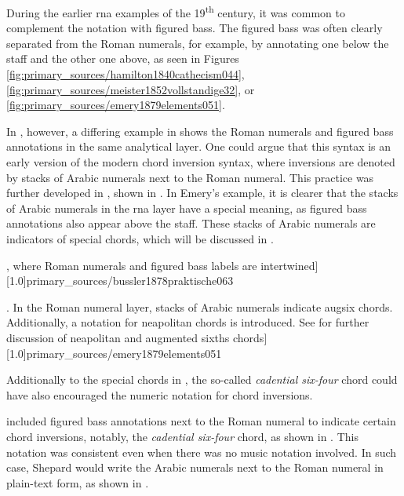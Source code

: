 
During the earlier \gls{rna} examples of the
19\textsuperscript{th} century, it was common to complement
the notation with figured bass. The figured bass was often
clearly separated from the Roman numerals, for example, by
annotating one below the staff and the other one above, as
seen in Figures
\ref{fig:primary_sources/hamilton1840cathecism044},
\ref{fig:primary_sources/meister1852vollstandige32}, or
\ref{fig:primary_sources/emery1879elements051}.

In ,
however, a differing example in
\textcite{bussler1878praktische} shows the Roman numerals
and figured bass annotations in the same analytical layer.
One could argue that this syntax is an early version of the
modern chord inversion syntax, where inversions are denoted
by stacks of Arabic numerals next to the Roman numeral. This
practice was further developed in
\textcite{emery1879elements}, shown in
. In Emery's
example, it is clearer that the stacks of Arabic numerals in
the \gls{rna} layer have a special meaning, as figured bass
annotations also appear above the staff. These stacks of
Arabic numerals are indicators of special chords, which will
be discussed in
.

\phdfigure[A single layer of chord annotations underneath
 the bass staff in \textcite[p.~63]{bussler1878praktische},
 where Roman numerals and figured bass labels are
 intertwined][1.0]{primary_sources/bussler1878praktische063}

\phdfigure[Use of Roman numerals and figured bass in
\textcite[p.~51]{emery1879elements}. In the Roman numeral
layer, stacks of Arabic numerals indicate \gls{augsix}
chords. Additionally, a notation for \gls{neapolitan} chords
is introduced. See
for further discussion of \gls{neapolitan} and augmented
sixths chords][1.0]{primary_sources/emery1879elements051}

Additionally to the special chords in
\textcite{emery1879elements}, the so-called \emph{cadential
six-four} chord could have also encouraged the numeric
notation for chord inversions.

\textcite{shepard1896harmony} included figured bass
annotations next to the Roman numeral to indicate certain
chord inversions, notably, the \emph{cadential six-four}
chord, as shown in
. This
notation was consistent even when there was no music
notation involved. In such case, Shepard would write the
Arabic numerals next to the Roman numeral in plain-text
form, as shown in
.

